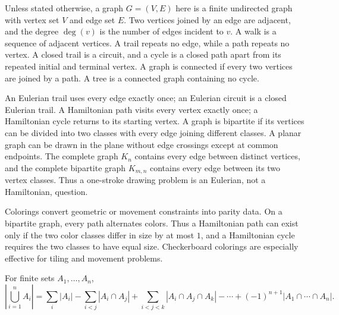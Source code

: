     \begin{definition}
        Unless stated otherwise, a graph $G=(V,E)$ here is a finite undirected
        graph with vertex set $V$ and edge set $E$. Two vertices joined by an
        edge are adjacent, and the degree $\deg(v)$ is the number of edges
        incident to $v$. A walk is a sequence of adjacent vertices. A trail
        repeats no edge, while a path repeats no vertex. A closed trail is a
        circuit, and a cycle is a closed path apart from its repeated initial
        and terminal vertex. A graph is connected if every two vertices are
        joined by a path. A tree is a connected graph containing no cycle.

        An Eulerian trail uses every edge exactly once; an Eulerian circuit is
        a closed Eulerian trail. A Hamiltonian path visits every vertex exactly
        once; a Hamiltonian cycle returns to its starting vertex. A graph is
        bipartite if its vertices can be divided into two classes with every
        edge joining different classes. A planar graph can be drawn in the
        plane without edge crossings except at common endpoints. The complete
        graph $K_n$ contains every edge between distinct vertices, and the
        complete bipartite graph $K_{m,n}$ contains every edge between its two
        vertex classes. Thus a one-stroke drawing problem is an Eulerian, not a
        Hamiltonian, question.
    \end{definition}

    \begin{strategy}
        Colorings convert geometric or movement constraints into parity data.
        On a bipartite graph, every path alternates colors. Thus a Hamiltonian
        path can exist only if the two color classes differ in size by at most
        $1$, and a Hamiltonian cycle requires the two classes to have equal size.
        Checkerboard colorings are especially effective for tiling and movement
        problems.
    \end{strategy}

    \begin{theorem}
        For finite sets $A_1,\dots,A_n$,
        \[
            \left|\bigcup_{i=1}^{n}A_i\right|
            =
            \sum_i |A_i|
            -
            \sum_{i<j}|A_i\cap A_j|
            +
            \sum_{i<j<k}|A_i\cap A_j\cap A_k|
            -\cdots
            +(-1)^{n+1}|A_1\cap\cdots\cap A_n|.
        \]
    \end{theorem}

